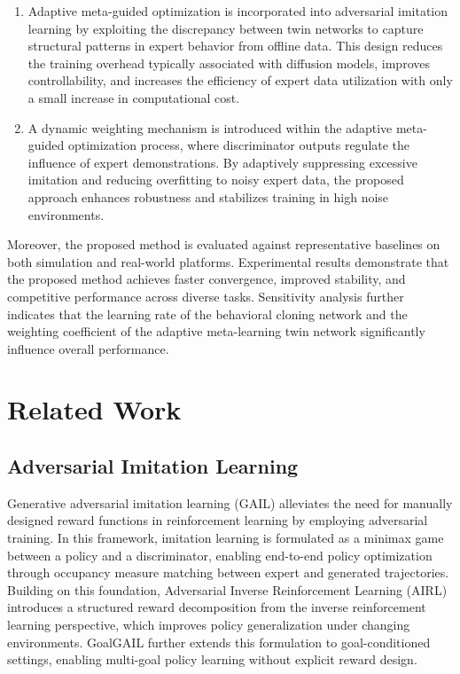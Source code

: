 \documentclass[journal]{IEEEtran}
\begin{document}
\begin{enumerate}
\item[1)] Adaptive meta-guided optimization is incorporated into adversarial imitation learning by exploiting the discrepancy between twin networks to capture structural patterns in expert behavior from offline data. This design reduces the training overhead typically associated with diffusion models, improves controllability, and increases the efficiency of expert data utilization with only a small increase in computational cost.

\item[2)] A dynamic weighting mechanism is introduced within the adaptive meta-guided optimization process, where discriminator outputs regulate the influence of expert demonstrations. By adaptively suppressing excessive imitation and reducing overfitting to noisy expert data, the proposed approach enhances robustness and stabilizes training in high noise environments.
\end{enumerate}
Moreover, the proposed method is evaluated against representative baselines on both simulation and real-world platforms. Experimental results demonstrate that the proposed method achieves faster convergence, improved stability, and competitive performance across diverse tasks. Sensitivity analysis further indicates that the learning rate of the behavioral cloning network and the weighting coefficient of the adaptive meta-learning twin network significantly influence overall performance.



\section{Related Work}
\subsection{Adversarial Imitation Learning}
Generative adversarial imitation learning (GAIL) alleviates the need for manually designed reward functions in reinforcement learning by employing adversarial training\cite{ho2016generative}. In this framework, imitation learning is formulated as a minimax game between a policy and a discriminator, enabling end-to-end policy optimization through occupancy measure matching between expert and generated trajectories. Building on this foundation, Adversarial Inverse Reinforcement Learning (AIRL)\cite{fu2017learning} introduces a structured reward decomposition from the inverse reinforcement learning perspective, which improves policy generalization under changing environments. GoalGAIL\cite{ding2019goal} further extends this formulation to goal-conditioned settings, enabling multi-goal policy learning without explicit reward design.
\end{document}
